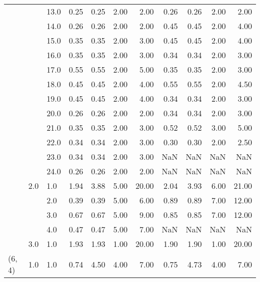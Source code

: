 \begin{tabular}{lllrrrrrrrr}
       &     & 13.0 &       0.25 &      0.25 & 2.00 &   2.00 &       0.26 &      0.26 & 2.00 &   2.00 \\
       &     & 14.0 &       0.26 &      0.26 & 2.00 &   2.00 &       0.45 &      0.45 & 2.00 &   4.00 \\
       &     & 15.0 &       0.35 &      0.35 & 2.00 &   3.00 &       0.45 &      0.45 & 2.00 &   4.00 \\
       &     & 16.0 &       0.35 &      0.35 & 2.00 &   3.00 &       0.34 &      0.34 & 2.00 &   3.00 \\
       &     & 17.0 &       0.55 &      0.55 & 2.00 &   5.00 &       0.35 &      0.35 & 2.00 &   3.00 \\
       &     & 18.0 &       0.45 &      0.45 & 2.00 &   4.00 &       0.55 &      0.55 & 2.00 &   4.50 \\
       &     & 19.0 &       0.45 &      0.45 & 2.00 &   4.00 &       0.34 &      0.34 & 2.00 &   3.00 \\
       &     & 20.0 &       0.26 &      0.26 & 2.00 &   2.00 &       0.34 &      0.34 & 2.00 &   3.00 \\
       &     & 21.0 &       0.35 &      0.35 & 2.00 &   3.00 &       0.52 &      0.52 & 3.00 &   5.00 \\
       &     & 22.0 &       0.34 &      0.34 & 2.00 &   3.00 &       0.30 &      0.30 & 2.00 &   2.50 \\
       &     & 23.0 &       0.34 &      0.34 & 2.00 &   3.00 &        NaN &       NaN &  NaN &    NaN \\
       &     & 24.0 &       0.26 &      0.26 & 2.00 &   2.00 &        NaN &       NaN &  NaN &    NaN \\
       & 2.0 & 1.0  &       1.94 &      3.88 & 5.00 &  20.00 &       2.04 &      3.93 & 6.00 &  21.00 \\
       &     & 2.0  &       0.39 &      0.39 & 5.00 &   6.00 &       0.89 &      0.89 & 7.00 &  12.00 \\
       &     & 3.0  &       0.67 &      0.67 & 5.00 &   9.00 &       0.85 &      0.85 & 7.00 &  12.00 \\
       &     & 4.0  &       0.47 &      0.47 & 5.00 &   7.00 &        NaN &       NaN &  NaN &    NaN \\
       & 3.0 & 1.0  &       1.93 &      1.93 & 1.00 &  20.00 &       1.90 &      1.90 & 1.00 &  20.00 \\
(6, 4) & 1.0 & 1.0  &       0.74 &      4.50 & 4.00 &   7.00 &       0.75 &      4.73 & 4.00 &   7.00 \\

\end{tabular}
